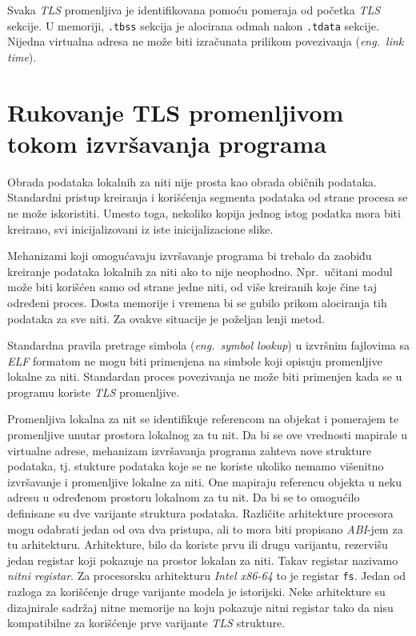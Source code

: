 \documentclass[12pt,oneside]{memoir}
\begin{document}
Svaka \emph{TLS} promenljiva je identifikovana pomoću pomeraja od početka \emph{TLS} sekcije. U memoriji, \texttt{.tbss} sekcija je alocirana odmah nakon \texttt{.tdata} sekcije. Nijedna virtualna adresa ne može biti izračunata prilikom povezivanja (\emph{eng.~link time}).

\section{Rukovanje TLS promenljivom tokom izvršavanja programa}
\label{sec:izvrTls}

Obrada podataka lokalnih za niti nije prosta kao obrada običnih podataka. Standardni pristup kreiranja i korišćenja segmenta podataka od strane procesa se ne može iskoristiti. Umesto toga, nekoliko kopija jednog istog podatka mora biti kreirano, svi inicijalizovani iz iste inicijalizacione slike.

Mehanizami koji omogućavaju izvršavanje programa bi trebalo da zaobiđu kreiranje podataka lokalnih za niti ako to nije neophodno. Npr.~učitani modul može biti korišćen samo od strane jedne niti, od više kreiranih koje čine taj određeni proces. Dosta memorije i vremena bi se gubilo prikom alociranja tih podataka za sve niti. Za ovakve situacije je poželjan lenji metod.

Standardna pravila pretrage simbola (\emph{eng.~symbol lookup}) u izvršnim fajlovima sa \emph{ELF} formatom ne mogu biti primenjena na simbole koji opisuju promenljive lokalne za niti. Standardan proces povezivanja ne može biti primenjen kada se u programu koriste \emph{TLS} promenljive.

Promenljiva lokalna za nit se identifikuje referencom na objekat i pomerajem te promenljive unutar prostora lokalnog za tu nit. Da bi se ove vrednosti mapirale u virtualne adrese, mehanizam izvršavanja programa zahteva nove strukture podataka, tj. stukture podataka koje se ne koriste ukoliko nemamo višenitno izvršavanje i promenljive lokalne za niti. One mapiraju referencu objekta u neku adresu u određenom prostoru lokalnom za tu nit. Da bi se to omogućilo definisane su dve varijante struktura podataka. Različite arhitekture procesora mogu odabrati jedan od ova dva pristupa, ali to mora biti propisano \emph{ABI}-jem za tu arhitekturu. Arhitekture, bilo da koriste prvu ili drugu varijantu, rezervišu jedan registar koji pokazuje na prostor lokalan za niti. Takav registar nazivamo \emph{nitni registar}. Za procesorsku arhitekturu \emph{Intel x86-64} to je registar \texttt{fs}. Jedan od razloga za korišćenje druge varijante modela je istorijski. Neke arhitekture su dizajnirale sadržaj nitne memorije na koju pokazuje nitni registar tako da nisu kompatibilne za korišćenje prve varijante \emph{TLS} strukture.
\end{document}
